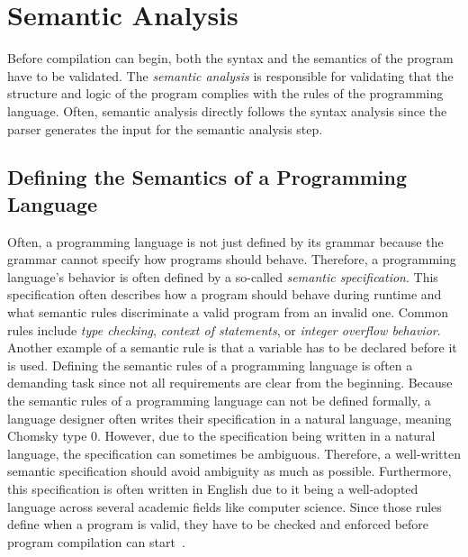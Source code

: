 \section{Semantic Analysis}
Before compilation can begin, both the syntax and the semantics of the program have to be validated.
The \emph{semantic analysis} is responsible for validating that the structure and logic of the program complies with the rules of the programming language.
Often, semantic analysis directly follows the syntax analysis since the parser generates the input for the semantic analysis step.

\subsection{Defining the Semantics of a Programming Language}
Often, a programming language is not just defined by its grammar
because the grammar cannot specify how programs should behave.
Therefore, a programming language's behavior is often defined by a so-called \emph{semantic specification}.
This specification often describes how a program should behave during runtime and what semantic rules discriminate a valid program from an invalid one.
Common rules include \emph{type checking}, \emph{context of statements}, or \emph{integer overflow behavior}.
Another example of a semantic rule is that a variable has to be declared before it is used.
Defining the semantic rules of a programming language is often a demanding task
since not all requirements are clear from the beginning.
Because the semantic rules of a programming language can not be defined formally,
a language designer often writes their specification in a natural language, meaning Chomsky type 0.
However, due to the specification being written in a natural language, the specification can sometimes be ambiguous.
Therefore, a well-written semantic specification should avoid ambiguity as much as possible.
Furthermore, this specification is often written in English
due to it being a well-adopted language across several academic fields like computer science.
Since those rules define when a program is valid, they have to be checked and enforced before program compilation can start~\cite[p.~21]{Watson2017}.

